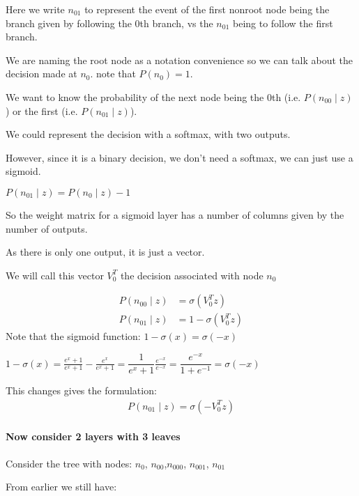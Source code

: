 \documentclass[parskip]{komatufte}
\begin{document}
Here we write $n_{01}$ to represent the event of the first nonroot
node being the branch given by following the 0th branch, vs the $n_{01}$
being to follow the first branch. 

We are naming the root node as a notation convenience so we can talk
about the decision made at $n_{0}$. note that $P(n_{0})=1$.

We want to know the probability of the next node being the 0th (i.e.
$P(n_{00}\mid z)$ ) or the first (i.e. $P(n_{01}\mid z)$).

We could represent the decision with a softmax, with two outputs.
 
However, since it is a binary decision, we don't need a softmax, we
can just use a sigmoid.

$P(n_{01}\mid z)=P(n_{0}\mid z)-1$

So the weight matrix for a sigmoid layer has a number of columns given
by the number of outputs.

As there is only one output, it is just a vector.

We will call this vector $V_{0}^{T}$ the decision
associated with node $n_{0}$

\begin{align}
P(n_{00}\mid z) &=\sigma(V_{0}^{T}z) \\
P(n_{01}\mid z) &=1-\sigma(V_{0}^{T}z)
\end{align}
Note that the sigmoid function: $1-\sigma(x)=\sigma(-x)$

$1-\sigma(x)=\frac{e^{x}+1}{e^{x}+1}-\frac{e^{x}}{e^{x}+1}=\dfrac{1}{e^{x}+1}\frac{e^{-x}}{e^{-x}}=\dfrac{e^{-x}}{1+e^{-1}}=\sigma(-x)$

This changes gives the formulation:
\begin{align}
P(n_{01}\mid z)=\sigma(-V_{0}^{T}z)
\end{align}


\paragraph{Now consider 2 layers with 3 leaves}

Consider the tree with nodes: $n_{0}$, $n_{00}$,$n_{000}$, $n_{001}$, $n_{01}$


From earlier we still have:
\end{document}
